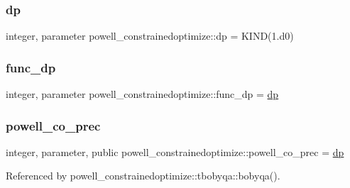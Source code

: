 \subsubsection{\texorpdfstring{dp}{dp}}
{\footnotesize\ttfamily integer, parameter powell\+\_\+constrainedoptimize\+::dp = K\+I\+ND(1.d0)\hspace{0.3cm}{\ttfamily [private]}}

\mbox{\label{namespacepowell__constrainedoptimize_a09e82bbc40fa02c9929d47a2d1c56bdb}} 
\subsubsection{\texorpdfstring{func\+\_\+dp}{func\_dp}}
{\footnotesize\ttfamily integer, parameter powell\+\_\+constrainedoptimize\+::func\+\_\+dp = \mbox{\hyperlink{namespacepowell__constrainedoptimize_a8a0275c8eca26a533d0e5d9aef7b9eaa}{dp}}\hspace{0.3cm}{\ttfamily [private]}}

\mbox{\label{namespacepowell__constrainedoptimize_a18207be3e2f370a42332601cfccca22e}} 
\subsubsection{\texorpdfstring{powell\+\_\+co\+\_\+prec}{powell\_co\_prec}}
{\footnotesize\ttfamily integer, parameter, public powell\+\_\+constrainedoptimize\+::powell\+\_\+co\+\_\+prec = \mbox{\hyperlink{namespacepowell__constrainedoptimize_a8a0275c8eca26a533d0e5d9aef7b9eaa}{dp}}}



Referenced by powell\+\_\+constrainedoptimize\+::tbobyqa\+::bobyqa().

